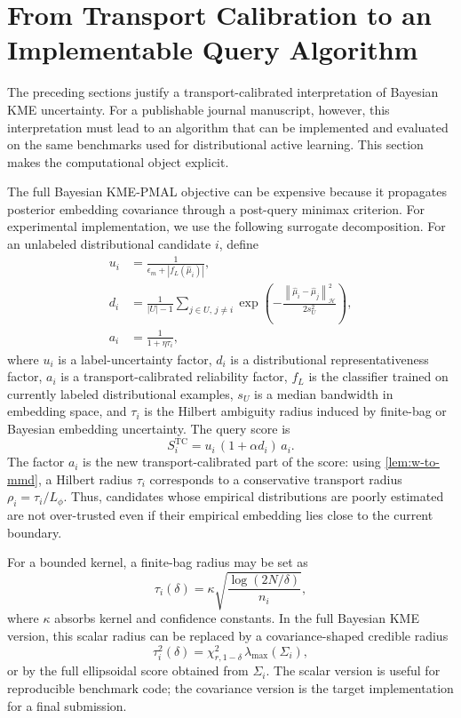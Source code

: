\documentclass[10pt,journal]{IEEEtran}
\newcommand{\Hcal}{\mathcal{H}}
\newcommand{\wh}{\widehat}
\newcommand{\norm}[1]{\left\lVert #1 \right\rVert}
\begin{document}
\section{From Transport Calibration to an Implementable Query Algorithm}
\label{sec:algorithm}

The preceding sections justify a transport-calibrated interpretation of Bayesian KME uncertainty. For a publishable journal manuscript, however, this interpretation must lead to an algorithm that can be implemented and evaluated on the same benchmarks used for distributional active learning. This section makes the computational object explicit.

The full Bayesian KME-PMAL objective can be expensive because it propagates posterior embedding covariance through a post-query minimax criterion. For experimental implementation, we use the following surrogate decomposition. For an unlabeled distributional candidate $i$, define
\begin{align}
    u_i &= \frac{1}{\epsilon_m+|f_L(\wh\mu_i)|}, \\
    d_i &= \frac{1}{|U|-1}\sum_{j\in U,\,j\ne i}\exp\left(-\frac{\norm{\wh\mu_i-\wh\mu_j}_{\Hcal}^2}{2s_U^2}\right), \\
    a_i &= \frac{1}{1+\eta\tau_i},
\end{align}
where $u_i$ is a label-uncertainty factor, $d_i$ is a distributional representativeness factor, $a_i$ is a transport-calibrated reliability factor, $f_L$ is the classifier trained on currently labeled distributional examples, $s_U$ is a median bandwidth in embedding space, and $\tau_i$ is the Hilbert ambiguity radius induced by finite-bag or Bayesian embedding uncertainty. The query score is
\begin{equation}
\label{eq:tc-score}
    S_i^{\mathrm{TC}} = u_i\,(1+\alpha d_i)\,a_i.
\end{equation}
The factor $a_i$ is the new transport-calibrated part of the score: using \cref{lem:w-to-mmd}, a Hilbert radius $\tau_i$ corresponds to a conservative transport radius $\rho_i=\tau_i/L_\phi$. Thus, candidates whose empirical distributions are poorly estimated are not over-trusted even if their empirical embedding lies close to the current boundary.

For a bounded kernel, a finite-bag radius may be set as
\begin{equation}
\label{eq:simple-radius}
    \tau_i(\delta)=\kappa\sqrt{\frac{\log(2N/\delta)}{n_i}},
\end{equation}
where $\kappa$ absorbs kernel and confidence constants. In the full Bayesian KME version, this scalar radius can be replaced by a covariance-shaped credible radius
\begin{equation}
\label{eq:bayes-radius-alg}
    \tau_i^2(\delta)=\chi^2_{r,1-\delta}\,\lambda_{\max}(\Sigma_i),
\end{equation}
or by the full ellipsoidal score obtained from $\Sigma_i$. The scalar version is useful for reproducible benchmark code; the covariance version is the target implementation for a final submission.
\end{document}
